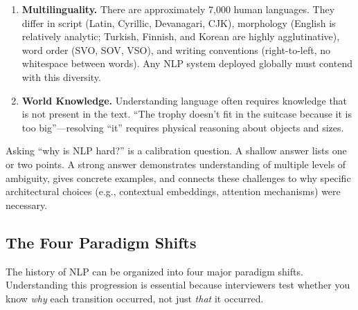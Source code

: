 \begin{enumerate}[label=\textbf{\arabic*.}]
    \item \textbf{Multilinguality.} There are approximately 7,000 human languages. They
    differ in script (Latin, Cyrillic, Devanagari, CJK), morphology (English is
    relatively analytic; Turkish, Finnish, and Korean are highly agglutinative), word
    order (SVO, SOV, VSO), and writing conventions (right-to-left, no whitespace
    between words). Any NLP system deployed globally must contend with this diversity.

    \item \textbf{World Knowledge.} Understanding language often requires knowledge that is
    not present in the text. ``The trophy doesn't fit in the suitcase because it is too
    big''---resolving ``it'' requires physical reasoning about objects and sizes.
\end{enumerate}

\begin{keyinsight}
Asking ``why is NLP hard?'' is a calibration question. A shallow answer lists one or two
points. A strong answer demonstrates understanding of multiple levels of ambiguity, gives
concrete examples, and connects these challenges to why specific architectural choices
(e.g., contextual embeddings, attention mechanisms) were necessary.
\end{keyinsight}

\subsection{The Four Paradigm Shifts}
\label{sec:paradigm_shifts}

The history of NLP can be organized into four major paradigm shifts. Understanding this
progression is essential because interviewers test whether you know \emph{why} each
transition occurred, not just \emph{that} it occurred.

